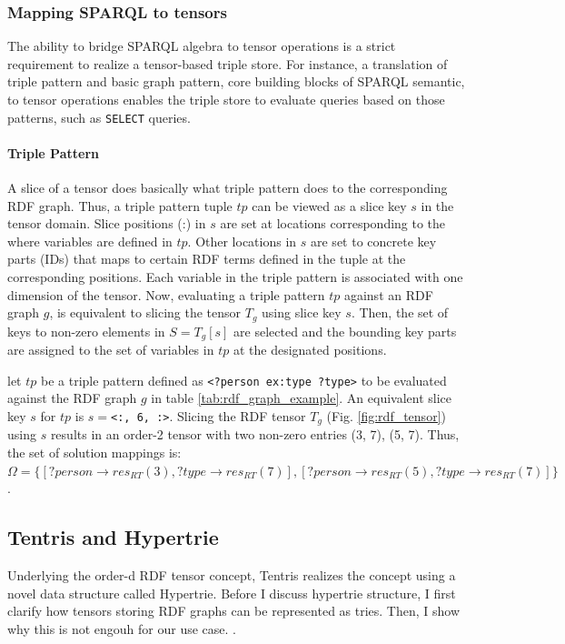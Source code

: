 \subsubsection{Mapping SPARQL to tensors}
The ability to bridge SPARQL algebra to tensor operations is a strict requirement to realize a tensor-based triple store. For instance, a translation of triple pattern and basic graph pattern, core building blocks of SPARQL semantic, to tensor operations enables the triple store to evaluate queries based on those patterns, such as \verb|SELECT| queries. 

\paragraph{Triple Pattern} A slice of a tensor does basically what triple pattern does to the corresponding RDF graph. Thus, a triple pattern tuple $tp$ can be viewed as a slice key $s$ in the tensor domain. Slice positions ($\textbf{:}$) in $s$ are set at locations corresponding to the where variables are defined in $tp$.  Other locations in $s$ are set to concrete key parts (IDs) that maps to certain RDF terms defined in the tuple at the corresponding positions. Each variable in the triple pattern is associated with one dimension of the tensor. Now, evaluating a triple pattern $tp$ against an RDF graph $g$, is equivalent to slicing the tensor $T_{g}$ using slice key $s$. Then, the set of keys to non-zero elements in $S = T_{g}[s]$ are selected and the bounding key parts are assigned to the set of variables in $tp$ at the designated positions. \\


\begin{example}
	let $tp$ be a triple pattern defined as \verb|<?person ex:type ?type>| to be evaluated against the RDF graph $g$ in table \ref{tab:rdf_graph_example}.  An equivalent slice key $s$ for $tp$ is $s=$\verb|<:, 6, :>|. Slicing the RDF tensor $T_{g}$ (Fig. \ref{fig:rdf_tensor}) using $s$ results in an order-2 tensor with two non-zero entries (3, 7), (5, 7). Thus, the set of solution mappings is:\\ $\Omega = \{[?person \to res_{RT}(3), ?type \to res_{RT}(7)], [?person \to res_{RT}(5), ?type \to res_{RT}(7)]\}$.
\end{example}

\clearpage

\subsection{Tentris and Hypertrie}
\label{sec:hypertrie}
Underlying the order-d RDF tensor concept, Tentris realizes the concept using a novel data structure called Hypertrie. Before I discuss hypertrie structure, I first clarify how tensors storing RDF graphs can be represented as tries. Then, I show why this is not engouh for our use case. .

